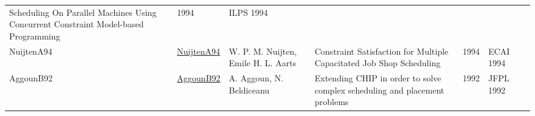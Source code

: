 {\begin{longtable}{llp{5cm}p{10cm}rp{3cm}l}
Scheduling On Parallel Machines Using Concurrent Constraint Model-based Programming & 1994 & ILPS 1994 & \cite{JourdanFRD94}\\NuijtenA94 & \href{}{NuijtenA94} & W. P. M. Nuijten, Emile H. L. Aarts & Constraint Satisfaction for Multiple Capacitated Job Shop Scheduling & 1994 & ECAI 1994 & \cite{NuijtenA94}\\AggounB92 & \href{}{AggounB92} & A. Aggoun, N. Beldiceanu & Extending {CHIP} in order to solve complex scheduling and placement problems & 1992 & JFPL 1992 & \cite{AggounB92}\\\end{longtable}
}

